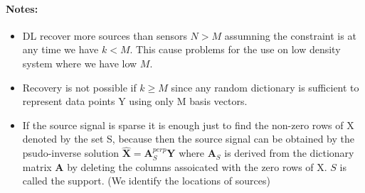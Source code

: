 \paragraph{Notes:}
\begin{itemize}
\item DL recover more sources than sensors $N > M$ assumning the constraint is at any time we have $k < M$. This cause problems for the use on low density system where we have low $M$.
\item Recovery is not possible if $k \geq M$ since any random dictionary is sufficient to represent data points Y using only M basis vectors.
\item If the source signal is sparse it is enough just to find the non-zero rows of X denoted by the set S, because then the source signal can be obtained by the psudo-inverse solution $\hat{\mathbf{X}} = \mathbf{A}_S^{perp} \mathbf{Y}$ where $\mathbf{A}_S$ is derived from the dictionary matrix $\mathbf{A}$ by deleting the columns assoicated with the zero rows of X. $S$ is called the support. (We identify the locations of sources)
\end{itemize}